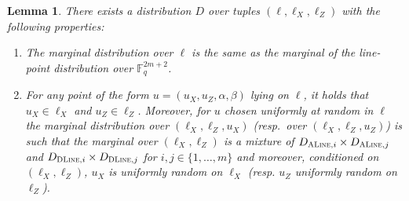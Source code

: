 \documentclass[11pt]{article}
\newtheorem{lemma}[theorem]{Lemma}
\theoremstyle{definition}
\newcommand{\F}{\ensuremath{\mathbb{F}}}
\newcommand{\typestyle}[1]{\ensuremath{\textsc{#1}}\xspace}
\renewcommand{\line}{\mathbf{\ell}}
\newcommand{\ALine}{\typestyle{ALine}}
\newcommand{\DLine}{\typestyle{DLine}}
\begin{document}
    \begin{lemma}\label{lem:qld-sublines}
      There exists a distribution $D$ over tuples $(\line, \line_X, \line_Z)$ with the following properties:
      \begin{enumerate}
      \item The marginal distribution over $\line$ is the same as the marginal of the line-point distribution over $\F_q^{2m+2}$.
\item For any point of the form $u = (u_X, u_Z, \alpha, \beta)$ lying on $\line$, it holds that $u_X \in \line_X$ and $u_Z \in \line_Z$. Moreover, for $u$ chosen uniformly at random in $\line$ the marginal distribution over $(\line_X,\line_Z, u_X)$ (resp.\ over $(\line_X,\line_Z, u_Z)$) is such that the marginal over $(\ell_X,\ell_Z)$ is a mixture of $D_{\ALine, i}\times D_{\ALine, j}$ and $D_{\DLine, i}\times D_{\DLine, j}$ for $i,j\in\{1,\ldots,m\}$ and moreover, conditioned on $(\ell_X,\ell_Z)$, $u_X$ is uniformly random on $\line_X$ (resp. $u_Z$ uniformly random on $\line_Z$). 
\end{enumerate}
    \end{lemma}
		
\end{document}
